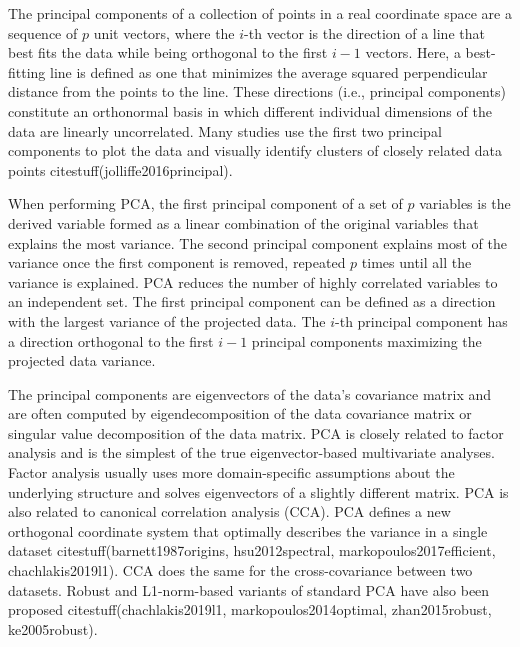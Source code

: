 \documentclass[preprint,12pt]{elsarticle}
\begin{document}
The principal components of a collection of points in a real coordinate space are a sequence of $p$ unit vectors, where the $i$-th vector is the direction of a line that best fits the data while being orthogonal to the first $i-1$ vectors. Here, a best-fitting line is defined as one that minimizes the average squared perpendicular distance from the points to the line. These directions (i.e., principal components) constitute an orthonormal basis in which different individual dimensions of the data are linearly uncorrelated. Many studies use the first two principal components to plot the data and visually identify clusters of closely related data points citestuff(jolliffe2016principal).

When performing PCA, the first principal component of a set of $p$ variables is the derived variable formed as a linear combination of the original variables that explains the most variance. The second principal component explains most of the variance once the first component is removed, repeated $p$ times until all the variance is explained. PCA reduces the number of highly correlated variables to an independent set. The first principal component can be defined as a direction with the largest variance of the projected data. The $i$-th principal component has a direction orthogonal to the first $i-1$ principal components maximizing the projected data variance.

The principal components are eigenvectors of the data's covariance matrix and are often computed by eigendecomposition of the data covariance matrix or singular value decomposition of the data matrix. PCA is closely related to factor analysis and is the simplest of the true eigenvector-based multivariate analyses. Factor analysis usually uses more domain-specific assumptions about the underlying structure and solves eigenvectors of a slightly different matrix. PCA is also related to canonical correlation analysis (CCA). PCA defines a new orthogonal coordinate system that optimally describes the variance in a single dataset citestuff(barnett1987origins, hsu2012spectral, markopoulos2017efficient, chachlakis2019l1). CCA does the same for the cross-covariance between two datasets. Robust and L1-norm-based variants of standard PCA have also been proposed citestuff(chachlakis2019l1, markopoulos2014optimal, zhan2015robust, ke2005robust).
\end{document}
